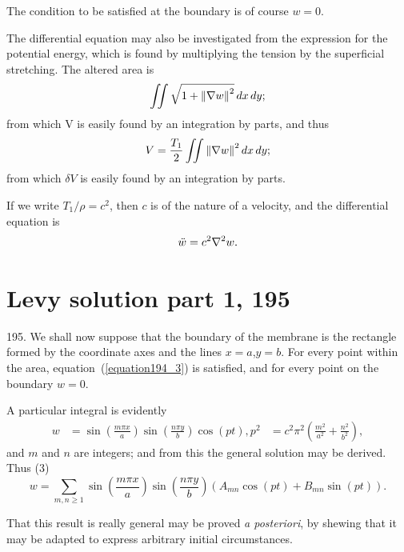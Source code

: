 The condition to be satisfied at the boundary is of course \(w=0\).

The differential equation may also be investigated from the expression for the potential energy, which is found by multiplying the tension by the superficial stretching.  The altered area is
\[ \iint \sqrt{ 1 + {\left\lVert\nabla w\right\rVert}^2} \, dx \, dy ;\]
from which V is easily found by an integration by parts, and thus
\begin{equation}
V=\frac{T_1}{2} \iint {\left\lVert\nabla w\right\rVert}^2 \, dx \, dy;
\end{equation}
from which \(\delta V\) is easily found by an integration by parts.

If we write
\(T_1/\rho = c^2\),
then \(c\) is of the nature of a velocity, and the
differential equation is
\begin{equation}\label{equation194_3} \ddot{w} = c^2 \nabla^2 w.\end{equation}

\setcounter{equation}{0}
\section{Levy solution part 1, 195}

195. We shall now suppose that the boundary of the membrane is the rectangle
formed by the coordinate axes and the lines \(x=a\),\(y=b\). For every point
within the area, equation~(\ref{equation194_3}) is satisfied, and for every
point on the boundary \(w=0\).

A particular integral is evidently
\begin{align}
w&=\sin \left(\frac{m \pi x}{a}\right) \sin \left(\frac{n \pi y}{b}\right) \cos(pt),
p^2 &= c^2 \pi^2 \left(\frac{m^2}{a^2} + \frac{n^2}{b^2} \right),
\end{align}
and \(m\) and \(n\) are integers; and from this the general solution may be derived. Thus (3)
\begin{equation}
w=\sum_{m,n \geq 1}
\sin \left(\frac{m \pi x}{a}\right) \sin \left(\frac{n \pi y}{b}\right)
(A_{mn} \cos(pt) + B_{mn} \sin(pt)).
\end{equation}

That this result is really general may be proved \textit{a posteriori}, by
shewing that it may be adapted to express arbitrary initial circumstances.

